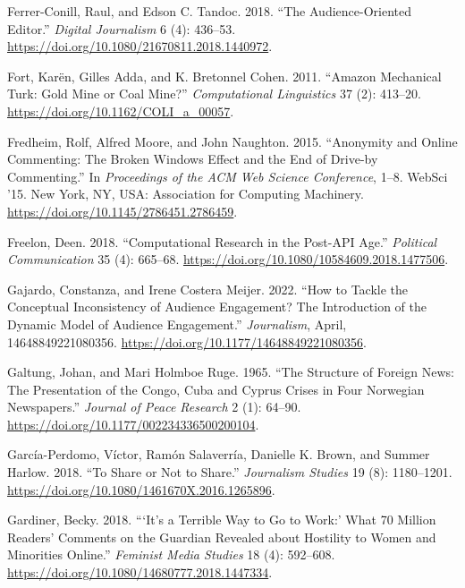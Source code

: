 \documentclass[
]{article}
\newlength{\cslhangindent}
\newlength{\cslentryspacingunit} %
\newenvironment{CSLReferences}[2] %
 {%
  \setlength{\parindent}{0pt}
  \ifodd #1
  \let\oldpar\par
  \def\par{\hangindent=\cslhangindent\oldpar}
  \fi
  \setlength{\parskip}{#2\cslentryspacingunit}
 }%
 {}
\begin{document}
\begin{CSLReferences}{1}{0}
\leavevmode{}%
Ferrer-Conill, Raul, and Edson C. Tandoc. 2018. {``The
{Audience}-{Oriented} {Editor}.''} \emph{Digital Journalism} 6 (4):
436--53. \url{https://doi.org/10.1080/21670811.2018.1440972}.

\leavevmode{}%
Fort, Karën, Gilles Adda, and K. Bretonnel Cohen. 2011. {``Amazon
{Mechanical} {Turk}: {Gold} {Mine} or {Coal} {Mine}?''}
\emph{Computational Linguistics} 37 (2): 413--20.
\url{https://doi.org/10.1162/COLI_a_00057}.

\leavevmode{}%
Fredheim, Rolf, Alfred Moore, and John Naughton. 2015. {``Anonymity and
{Online} {Commenting}: {The} {Broken} {Windows} {Effect} and the {End}
of {Drive}-by {Commenting}.''} In \emph{Proceedings of the {ACM} {Web}
{Science} {Conference}}, 1--8. {WebSci} '15. New York, NY, USA:
Association for Computing Machinery.
\url{https://doi.org/10.1145/2786451.2786459}.

\leavevmode{}%
Freelon, Deen. 2018. {``Computational {Research} in the {Post}-{API}
{Age}.''} \emph{Political Communication} 35 (4): 665--68.
\url{https://doi.org/10.1080/10584609.2018.1477506}.

\leavevmode{}%
Gajardo, Constanza, and Irene Costera Meijer. 2022. {``How to Tackle the
Conceptual Inconsistency of Audience Engagement? {The} Introduction of
the {Dynamic} {Model} of {Audience} {Engagement}.''} \emph{Journalism},
April, 14648849221080356.
\url{https://doi.org/10.1177/14648849221080356}.

\leavevmode{}%
Galtung, Johan, and Mari Holmboe Ruge. 1965. {``The {Structure} of
{Foreign} {News}: {The} {Presentation} of the {Congo}, {Cuba} and
{Cyprus} {Crises} in {Four} {Norwegian} {Newspapers}.''} \emph{Journal
of Peace Research} 2 (1): 64--90.
\url{https://doi.org/10.1177/002234336500200104}.

\leavevmode{}%
García-Perdomo, Víctor, Ramón Salaverría, Danielle K. Brown, and Summer
Harlow. 2018. {``To {Share} or {Not} to {Share}.''} \emph{Journalism
Studies} 19 (8): 1180--1201.
\url{https://doi.org/10.1080/1461670X.2016.1265896}.

\leavevmode{}%
Gardiner, Becky. 2018. {``{`{It}'s a Terrible Way to Go to Work:'} What
70 Million Readers' Comments on the {Guardian} Revealed about Hostility
to Women and Minorities Online.''} \emph{Feminist Media Studies} 18 (4):
592--608. \url{https://doi.org/10.1080/14680777.2018.1447334}.


\end{CSLReferences}
\end{document}
